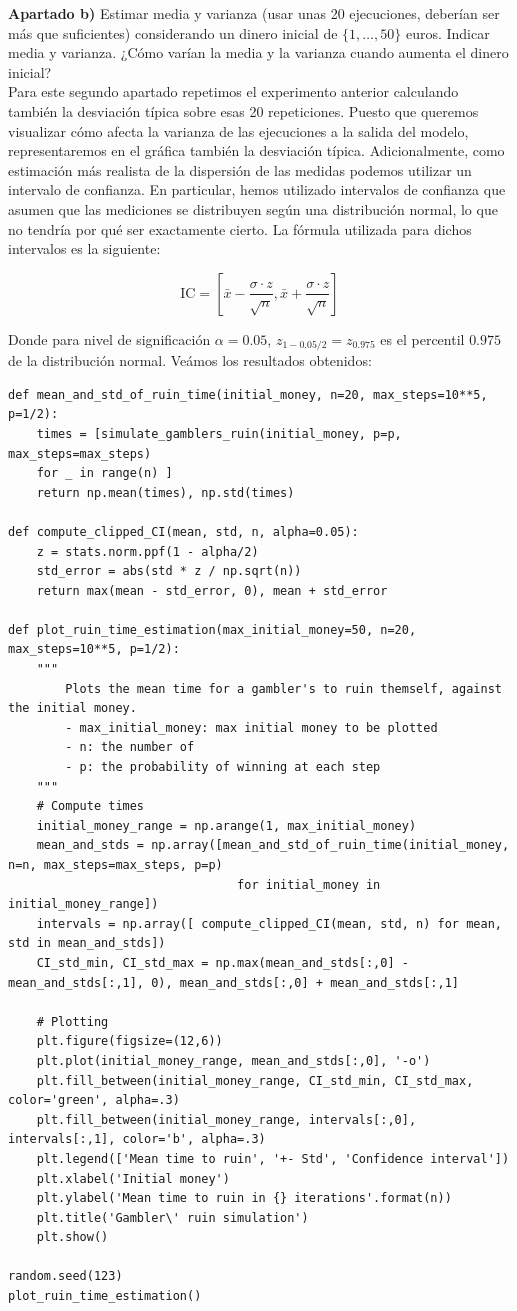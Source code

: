 \documentclass[a4paper]{article}
\begin{document}
\textbf{Apartado b)} Estimar media y varianza (usar unas 20 ejecuciones, deberían ser más que suficientes) considerando un dinero inicial de $\{1, \ldots, 50\}$ euros. Indicar media y varianza. ¿Cómo varían la media y la varianza cuando aumenta el dinero inicial? \\

Para este segundo apartado repetimos el experimento anterior calculando también la desviación típica sobre esas 20 repeticiones. Puesto que queremos visualizar cómo afecta la varianza de las ejecuciones a la salida del modelo, representaremos en el gráfica también la desviación típica. Adicionalmente, como estimación más realista de la dispersión de las medidas podemos utilizar un intervalo de confianza. En particular, hemos utilizado intervalos de confianza que asumen que las mediciones se distribuyen según una distribución normal, lo que no tendría por qué ser exactamente cierto. La fórmula utilizada para dichos intervalos es la siguiente:

\[
	\text{IC} = [ \bar x - \frac{\sigma \cdot z}{\sqrt n}, \bar x + \frac{\sigma \cdot z}{\sqrt n}  ]
\]

Donde para nivel de significación $\alpha = 0.05$, $z_{1 - 0.05/2} = z_{0.975}$ es el percentil $0.975$ de la distribución normal. Veámos los resultados obtenidos:

\begin{verbatim}
def mean_and_std_of_ruin_time(initial_money, n=20, max_steps=10**5, p=1/2):
	times = [simulate_gamblers_ruin(initial_money, p=p, max_steps=max_steps)
	for _ in range(n) ]
	return np.mean(times), np.std(times)

def compute_clipped_CI(mean, std, n, alpha=0.05):
	z = stats.norm.ppf(1 - alpha/2)
	std_error = abs(std * z / np.sqrt(n))
	return max(mean - std_error, 0), mean + std_error

def plot_ruin_time_estimation(max_initial_money=50, n=20, max_steps=10**5, p=1/2):
	"""
		Plots the mean time for a gambler's to ruin themself, against the initial money.
		- max_initial_money: max initial money to be plotted
		- n: the number of 
		- p: the probability of winning at each step
	"""
	# Compute times
	initial_money_range = np.arange(1, max_initial_money)
	mean_and_stds = np.array([mean_and_std_of_ruin_time(initial_money, n=n, max_steps=max_steps, p=p)
								for initial_money in initial_money_range])
	intervals = np.array([ compute_clipped_CI(mean, std, n) for mean, std in mean_and_stds])
	CI_std_min, CI_std_max = np.max(mean_and_stds[:,0] - mean_and_stds[:,1], 0), mean_and_stds[:,0] + mean_and_stds[:,1]
	
	# Plotting
	plt.figure(figsize=(12,6))
	plt.plot(initial_money_range, mean_and_stds[:,0], '-o')
	plt.fill_between(initial_money_range, CI_std_min, CI_std_max, color='green', alpha=.3)
	plt.fill_between(initial_money_range, intervals[:,0], intervals[:,1], color='b', alpha=.3)
	plt.legend(['Mean time to ruin', '+- Std', 'Confidence interval'])
	plt.xlabel('Initial money')
	plt.ylabel('Mean time to ruin in {} iterations'.format(n))
	plt.title('Gambler\' ruin simulation')
	plt.show()
	
random.seed(123)
plot_ruin_time_estimation()
\end{verbatim}
\end{document}
